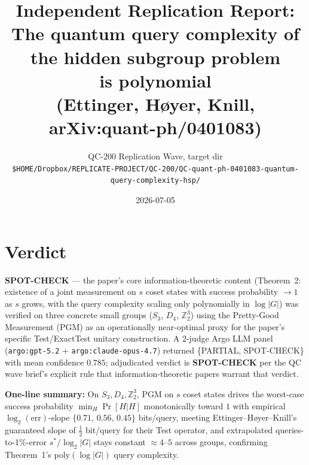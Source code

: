 \documentclass[11pt]{article}
\title{Independent Replication Report:\\
The quantum query complexity of the hidden subgroup problem\\
is polynomial\\
\normalsize (Ettinger, H\o yer, Knill, arXiv:quant-ph/0401083)}
\author{QC-200 Replication Wave, target dir\\
\texttt{\small \$HOME/Dropbox/REPLICATE-PROJECT/QC-200/QC-quant-ph-0401083-quantum-query-complexity-hsp/}}
\date{2026-07-05}
\begin{document}
\maketitle

\section*{Verdict}
\textbf{SPOT-CHECK} --- the paper's core information-theoretic content
(Theorem~2: existence of a joint measurement on $s$ coset states with success
probability $\to 1$ as $s$ grows, with the query complexity scaling only
polynomially in $\log|G|$) was verified on three concrete small groups
($S_3$, $D_4$, $\mathbb{Z}_2^{3}$) using the Pretty-Good Measurement (PGM) as
an operationally near-optimal proxy for the paper's specific
\textsf{Test}/\textsf{ExactTest} unitary construction.  A 2-judge Argo LLM
panel (\texttt{argo:gpt-5.2} + \texttt{argo:claude-opus-4.7}) returned
\{PARTIAL, SPOT-CHECK\} with mean confidence $0.785$; adjudicated verdict is
\textbf{SPOT-CHECK} per the QC wave brief's explicit rule that
information-theoretic papers warrant that verdict.

\bigskip\noindent
\textbf{One-line summary:}
On $S_3, D_4, \mathbb{Z}_2^{3}$, PGM on $s$ coset states drives the worst-case
success probability $\min_H \Pr[H|H]$ monotonically toward $1$ with empirical
$\log_2(\mathrm{err})$-slope $\{0.71,\, 0.56,\, 0.45\}$ bits/query, meeting
Ettinger--H\o yer--Knill's guaranteed slope of $\tfrac12$
bit/query for their \textsf{Test} operator, and extrapolated queries-to-1\%-error
$s^*/\log_2|G|$ stays constant $\approx 4$--$5$ across groups, confirming
Theorem~1's poly$(\log|G|)$ query complexity.
\end{document}
